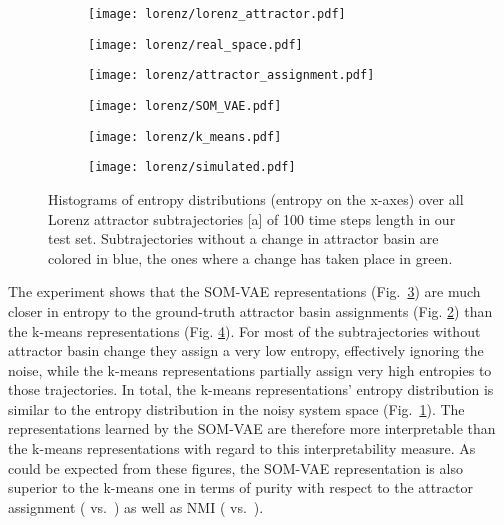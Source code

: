 \documentclass{article}
\begin{document}
\begin{figure}[h!]
    \centering
    \begin{subfigure}[t]{0.15\textwidth}
\centering
\texttt{[image: lorenz/lorenz\_attractor.pdf]}
\end{subfigure}
    \begin{subfigure}[t]{0.15\textwidth}
\centering
\texttt{[image: lorenz/real\_space.pdf]}
\label{fig:lorenz_real}
\end{subfigure}
    \begin{subfigure}[t]{0.15\textwidth}
\centering
\texttt{[image: lorenz/attractor\_assignment.pdf]}
\label{fig:lorenz_assignment}
\end{subfigure}
    \begin{subfigure}[t]{0.15\textwidth}
\centering
\texttt{[image: lorenz/SOM\_VAE.pdf]}
\label{fig:lorenz_somvae}
\end{subfigure}
    \begin{subfigure}[t]{0.15\textwidth}
\centering
\texttt{[image: lorenz/k\_means.pdf]}
\label{fig:lorenz_kmeans}
\end{subfigure}
    \begin{subfigure}[t]{0.15\textwidth}
\centering
\texttt{[image: lorenz/simulated.pdf]}
\label{fig:lorenz_simulated}
\end{subfigure}

    \caption{Histograms of entropy distributions (entropy on the x-axes) over all Lorenz attractor subtrajectories [a] of 100 time steps length in our test set. Subtrajectories without a change in attractor basin are colored in blue, the ones where a change has taken place in green.}
    \label{fig:lorenz}
\end{figure}

The experiment shows that the SOM-VAE representations (Fig.~\ref{fig:lorenz_somvae}) are much closer in entropy to the ground-truth attractor basin assignments (Fig. \ref{fig:lorenz_assignment}) than the k-means representations (Fig. \ref{fig:lorenz_kmeans}).
For most of the subtrajectories without attractor basin change they assign a very low entropy, effectively ignoring the noise, while the k-means representations partially assign very high entropies to those trajectories.
In total, the k-means representations' entropy distribution is similar to the entropy distribution in the noisy system space (Fig.~\ref{fig:lorenz_real}).
The representations learned by the SOM-VAE are therefore more interpretable than the k-means representations with regard to this interpretability measure.
As could be expected from these figures, the SOM-VAE representation is also superior to the k-means one in terms of purity with respect to the attractor assignment ( vs.\ ) as well as NMI ( vs.\ ).
\end{document}
